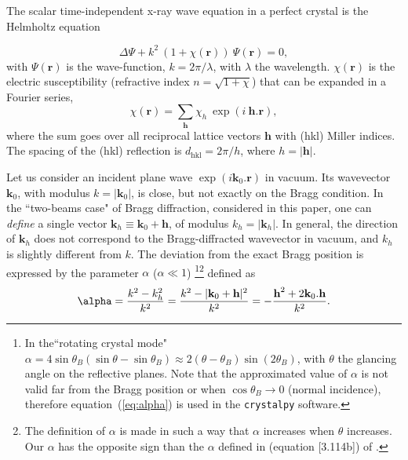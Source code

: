 \documentclass[preprint]{iucr}              %
\newcommand{\inblue}[1]{{\color{blue}#1}}
\begin{document}
The scalar time-independent x-ray wave equation in a perfect crystal is the Helmholtz equation

\begin{equation}
\label{eq:helmholz}
    \Delta \Psi + k^2~(1+\chi(\textbf{r})) ~\Psi(\textbf{r}) = 0,
\end{equation}
with $\Psi(\textbf{r})$ is the wave-function, $k=2\pi/\lambda$, with $\lambda$ the wavelength. $\chi(\textbf{r})$ is the electric susceptibility (refractive index $n=\sqrt{1+\chi}$)
that can be expanded in a Fourier series,
\begin{equation}
\label{eq:chi}
    \chi(\textbf{r}) = \sum_{\textbf{h}} \chi_h ~\exp(i~\textbf{h} . \textbf{r}),
\end{equation}
where 
the sum goes over all reciprocal lattice vectors $\textbf{h}$ with (hkl) Miller indices. 
The spacing of the (hkl) reflection is $d_\text{hkl}=2 \pi/h$, where $h=|\textbf{h}|$.

Let us consider an incident plane wave $\exp(i\textbf{k}_0 . \textbf{r})$ in vacuum. Its wavevector $\textbf{k}_0$, with modulus $k=|\textbf{k}_0|$, is close, but not exactly on the Bragg condition.
In the ``two-beams case" of Bragg diffraction, considered in this paper, one can \textit{define} a single vector $\textbf{k}_h \equiv \textbf{k}_0+\textbf{h}$, \inblue{of modulus  $k_h=|\textbf{k}_h|$}.
In general, the direction of $\textbf{k}_h$ does not correspond to the Bragg-diffracted wavevector in vacuum, and $k_h$ is slightly different from $k$.
The deviation from the exact Bragg position is expressed by the parameter $\alpha$ ($\alpha \ll 1$)
 \footnote{In the``rotating crystal mode" $\alpha=4 \sin \theta_B (\sin \theta - \sin \theta_B) \approx 2 (\theta-\theta_B) \sin (2\theta_B)$, with $\theta$ the glancing angle on the reflective planes. Note that the approximated value of $\alpha$ is not valid far from the Bragg position or when $\cos\theta_B \rightarrow 0$ (normal incidence), therefore  equation~(\ref{eq:alpha}) is used in the {\tt crystalpy} software. }\footnote{
 The \inblue{definition of} $\alpha$ is made in such a way that $\alpha$ increases when $\theta$ increases. Our $\alpha$ has the opposite sign than the $\alpha$ defined in (equation [3.114b]) of \cite{ZachariasenBook}. 
 } defined as
\begin{equation}
\label{eq:alpha}
\alpha = \frac{k^2-k_h^2}{k^2} = \frac{k^2-|\textbf k_0 + \textbf h|^2}{k^2} = - \frac{\textbf h^2 + 2 \textbf k_0 . \textbf h}{k^2}.
\end{equation}
\end{document}

